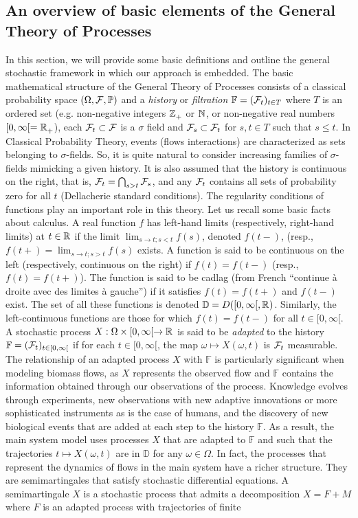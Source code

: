 \documentclass[12pt]{article}
\begin{document}
\subsection{An overview of basic elements of the General Theory of Processes}
In this section, we will provide some basic definitions and outline the general stochastic framework in which our approach is embedded. The basic mathematical structure of the General Theory of Processes consists of a classical probability space $(\Omega,\mathcal{F},\mathbb{P})$ and a \textit{history} or \textit{filtration} $\mathbb{F}=({\mathcal{F}}_{t})_{t\in T}$ where $T$ is an ordered set (e.g. non-negative integers $\mathbb{Z}^{}_+$ or ${\mathbb{N}}^{}$, or non-negative real numbers $[0,\infty[={\mathbb R}^{}_+$), each $\mathcal{F}_t\subset\mathcal{F}$ is a $\sigma$ field and $\mathcal{F}_s\subset\mathcal{F}_t$ for $s,t\in T$ such that $s\leq t$. In Classical Probability Theory, events (flows interactions) are characterized as sets belonging to $\sigma$-fields. So, it is quite natural to consider increasing families of $\sigma$-fields mimicking a given history. It is also assumed that the history is continuous on the right, that is, $\mathcal{F}_t=\bigcap_{s>t}\mathcal{F}_s$, and any $\mathcal{F}_t$ contains all sets of probability zero for all $t$ (Dellacherie standard conditions). The regularity conditions of functions play an important role in this theory. Let us recall some basic facts about calculus. A real function $f$ has left-hand limits (respectively, right-hand limits) at $t\in{\mathbb R}^{}$ if the limit $\lim_{s\to t; s<t}f(s)$, denoted $f(t-)$, (resp., $f(t+)=\lim_{s\to t; s>t}f(s)$ exists. A function is said to be continuous on the left (respectively, continuous on the right) if $f(t)=f(t-)$ (resp., $f(t)=f(t+)$). The function is said to be cadlag (from French ``continue à droite avec des limites à gauche'') if it satisfies $f(t)=f(t+)$ and $f(t-)$ exist. The set of all these functions is denoted $\mathbb{D}=D([0,\infty[,{\mathbb R}^{})$. Similarly, the left-continuous functions are those for which $f(t)=f(t-)$ for all $t\in [0,\infty[$. A stochastic process $X:\Omega\times [0,\infty[\to {\mathbb R}^{}$  is said to be \textit{adapted} to the history $\mathbb{F}=({\mathcal{F}}_{t})_{t\in [0,\infty[}$ if for each $t\in [0,\infty[$, the map $\omega\mapsto X(\omega,t)$ is $\mathcal{F}_t$ measurable. The relationship of an adapted process $X$ with $\mathbb{F}$ is particularly significant when modeling biomass flows, as $X$ represents the observed flow and $\mathbb{F}$ contains the information obtained through our observations of the process. Knowledge evolves through experiments, new observations with new adaptive innovations or more sophisticated instruments as is the case of humans, and the discovery of new biological events that are added at each step to the history $\mathbb{F}$. As a result, the main system model uses processes $X$ that are adapted to $\mathbb{F}$ and such that the trajectories $t\mapsto X(\omega,t)$ are in $\mathbb{D}$ for any $\omega\in\Omega$. In fact, the processes that represent the dynamics of flows in the main system have a richer structure. They are semimartingales that satisfy stochastic differential equations. A semimartingale $X$ is a stochastic process that admits a decomposition $X=F+M$ where $F$ is an adapted process with trajectories of finite 
\end{document}

